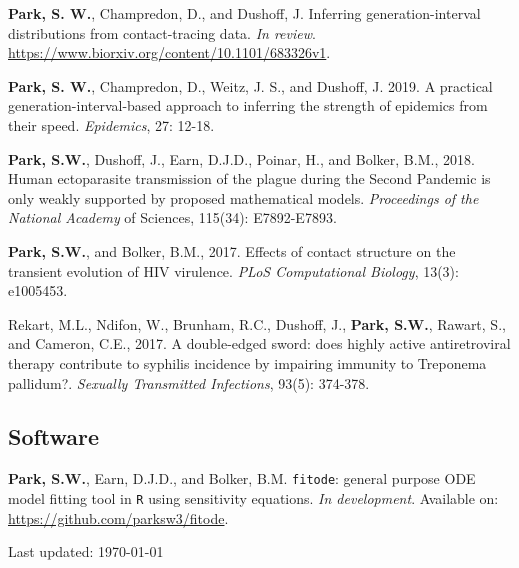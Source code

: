 \documentclass[11pt]{article} %
\begin{document}
 \textbf{Park, S. W.}, Champredon, D., and Dushoff, J. Inferring generation-interval distributions from contact-tracing data. \textit{In review}. \href{https://www.biorxiv.org/content/10.1101/683326v1}{https://www.biorxiv.org/content/10.1101/683326v1}.

 \textbf{Park, S. W.}, Champredon, D., Weitz, J. S., and Dushoff, J. 2019. A practical generation-interval-based approach to inferring the strength of epidemics from their speed. \textit{Epidemics}, 27: 12-18.

 \textbf{Park, S.W.}, Dushoff, J., Earn, D.J.D., Poinar, H., and Bolker, B.M., 2018. Human
ectoparasite transmission of the plague during the Second Pandemic is only weakly
supported by proposed mathematical models. \textit{Proceedings of the National Academy}
of Sciences, 115(34): E7892-E7893.

 \textbf{Park, S.W.}, and Bolker, B.M., 2017. Effects of contact structure on the transient
evolution of HIV virulence. \textit{PLoS Computational Biology}, 13(3): e1005453.

 Rekart, M.L., Ndifon, W., Brunham, R.C., Dushoff, J., \textbf{Park, S.W.}, Rawart, S., and
Cameron, C.E., 2017. A double-edged sword: does highly active antiretroviral therapy contribute to syphilis incidence by impairing immunity to Treponema pallidum?.
\textit{Sexually Transmitted Infections}, 93(5): 374-378.\\



\subsection*{Software}

 \textbf{Park, S.W.}, Earn, D.J.D., and Bolker, B.M. \texttt{fitode}: general purpose ODE model
fitting tool in \texttt{R} using sensitivity equations. \textit{In development}.
Available on: \href{https://github.com/parksw3/fitode}{https://github.com/parksw3/fitode}.



\vfill %


\begin{center}
	\scriptsize
	Last updated: \today
\end{center}

\end{document}
